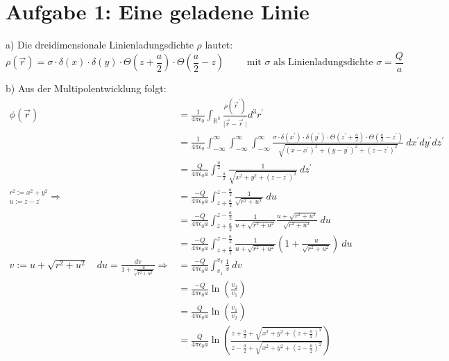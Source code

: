 \documentclass[11pt a4paper]{article}
\newcommand{\epsz}{\epsilon_0}
\newcommand{\kco}{\frac{1}{4\pi\epsilon_0}}
\begin{document}
\thispagestyle{fancy}
\section*{Aufgabe 1: Eine geladene Linie}
\par{a)}
Die dreidimensionale Linienladungsdichte $\rho$ lautet:
\[
	\rho(\vec r) =
	\sigma \cdot \delta(x) \cdot \delta(y) \cdot 
	\Theta\left( z + \frac a 2 \right)
	\cdot \Theta\left(\frac a 2 - z\right)
	\qquad \text{ mit } \sigma \text{ als Linienladungsdichte }
	\sigma = \frac Q a
\]

\par{b)}
Aus der Multipolentwicklung folgt:
\begin{align*}
	\phi (\vec r) 
	&= \kco 
	\int_{\mathbb{R}^3} \frac{\rho(\vec r^\prime)}
	{\vert \vec r - \vec r^\prime \vert} 
	d^3r^\prime \\
	&= \kco
	\int_{-\infty}^\infty
	\int_{-\infty}^\infty
	\int_{-\infty}^\infty
	\frac{
	\sigma \cdot \delta(x^\prime) \cdot \delta(y^\prime) \cdot 
	\Theta\left( z^\prime + \frac a 2 \right)
	\cdot \Theta\left(\frac a 2 - z^\prime \right)}
	{\sqrt{(x-x^\prime)^2 + (y-y^\prime)^2 + (z-z^\prime)^2}} \
	dx^\prime dy^\prime dz^\prime\\
	&= \frac{Q}{4\pi\epsz a} \int_{-\frac a 2}^{\frac a 2}
	\frac1{\sqrt{x^2 + y^2 + (z-z^\prime)^2}} \ dz^\prime \\
	^{r^2 := x^2 + y^2}
	_{u := z - z^\prime}
	\Rightarrow
	&= \frac{-Q}{4\pi\epsz a} \int_{z+\frac a 2}^{z-\frac a 2}
	\frac1{\sqrt{r^2 + u^2}} \ du \\
	&= \frac{-Q}{4\pi\epsz a} \int_{z+\frac a 2}^{z-\frac a 2}
	\frac{1}{u + \sqrt{r^2 + u^2}}
	\frac{u + \sqrt{r^2 + u^2}}{\sqrt{r^2 + u^2}} 
	\ du \\
	&= \frac{-Q}{4\pi\epsz a} \int_{z+\frac a 2}^{z-\frac a 2}
	\frac{1}{u + \sqrt{r^2 + u^2}}
	\left( 1 + \frac{u}{\sqrt{r^2 + u^2}} \right)
	\ du \\
	v:= u+\sqrt{r^2 + u^2} \quad
	du = \frac{dv}{1 + \frac{u}{\sqrt{r^2 + u^2}}}
	\Rightarrow
	&= \frac{-Q}{4\pi\epsz a} \int_{v_1}^{v_2}
	\frac{1}{v}
	\ dv \\
	&= \frac{-Q}{4\pi\epsz a}
	\ln \left( \frac{v_2}{v_1} \right) \\
	&= \frac{Q}{4\pi\epsz a}
	\ln \left( \frac{v_1}{v_2} \right) \\
	&= \frac{Q}{4\pi\epsz a}
	\ln \left( \frac{
		z+\frac a 2 + \sqrt{x^2 + y^2 + \left(z+\frac a 2\right)^2}}
	{
		z-\frac a 2 + \sqrt{x^2 + y^2 + \left(z-\frac a 2\right)^2}}
	\right)
\end{align*}
\end{document}
